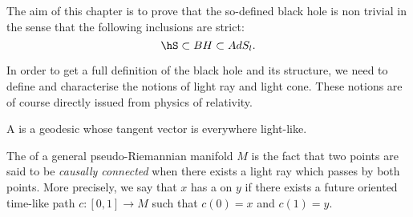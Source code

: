 The aim of this chapter is to prove that the so-defined black hole is non trivial in the sense that the following inclusions are strict:
\begin{equation}		\label{EqhSssubBH}
 \hS\subset BH\subset AdS_l.
 \end{equation}




In order to get a full definition of the black hole and its structure, we need to define and characterise the notions of light ray and light cone. These notions are of course directly issued from physics of relativity.  
\begin{definition}
A  is a geodesic whose tangent vector is everywhere light-like.
\label{lightraycone}
 \end{definition}

The  of a general pseudo-Riemannian manifold $M$ is the fact that two points are said to be \emph{causally connected} when there exists a light ray which passes by both points. More precisely, we say that $x$ has a  on $y$ if there exists a future oriented time-like path $c\colon [0,1]\to M$ such that $c(0)=x$ and $c(1)=y$.

